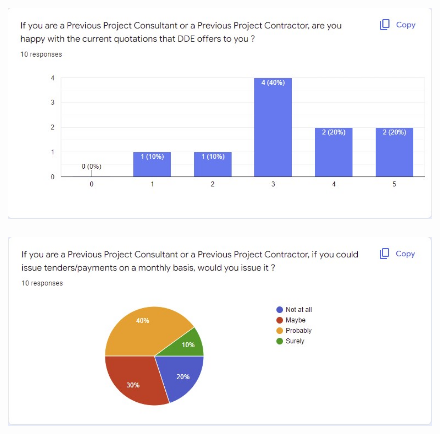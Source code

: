 	\begin{figure}[H]
    	\centering
    	\includegraphics[width=15cm]{q9.jpg}
    	\label{}
	\end{figure}
	
	\begin{figure}[H]
    	\centering
    	\includegraphics[width=15cm]{q10.jpg}
    	\label{}
	\end{figure}













